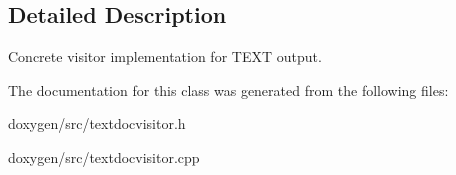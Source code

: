 \subsection{Detailed Description}
Concrete visitor implementation for T\+E\+XT output. 

The documentation for this class was generated from the following files\+:\begin{DoxyCompactItemize}
\item 
doxygen/src/textdocvisitor.\+h\item 
doxygen/src/textdocvisitor.\+cpp\end{DoxyCompactItemize}

